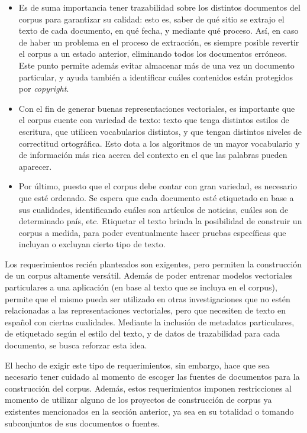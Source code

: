 \begin{itemize}
\item Es de suma importancia tener trazabilidad sobre los distintos documentos del corpus para
garantizar su calidad: esto es, saber de qué sitio se extrajo el texto de cada documento, en qué
fecha, y mediante qué proceso. Así, en caso de haber un problema en el proceso de extracción, es
siempre posible revertir el corpus a un estado anterior, eliminando todos los documentos
erróneos. Este punto permite además evitar almacenar más de una vez un documento particular, y ayuda
también a identificar cuáles contenidos están protegidos por \textit{copyright}.

\item Con el fin de generar buenas representaciones vectoriales, es importante que el corpus cuente
con variedad de texto: texto que tenga distintos estilos de escritura, que utilicen vocabularios
distintos, y que tengan distintos niveles de correctitud ortográfica. Esto dota a los algoritmos de
un mayor vocabulario y de información más rica acerca del contexto en el que las palabras pueden
aparecer.

\item Por último, puesto que el corpus debe contar con gran variedad, es necesario que esté
ordenado. Se espera que cada documento esté etiquetado en base a sus cualidades, identificando
cuáles son artículos de noticias, cuáles son de determinado país, etc. Etiquetar el texto brinda la
posibilidad de construir un corpus a medida, para poder eventualmente hacer pruebas específicas que
incluyan o excluyan cierto tipo de texto.

\end{itemize}

Los requerimientos recién planteados son exigentes, pero permiten la construcción de un corpus
altamente versátil. Además de poder entrenar modelos vectoriales particulares a una aplicación (en
base al texto que se incluya en el corpus), permite que el mismo pueda ser utilizado en otras
investigaciones que no estén relacionadas a las representaciones vectoriales, pero que necesiten de
texto en español con ciertas cualidades. Mediante la inclusión de metadatos particulares, de
etiquetado según el estilo del texto, y de datos de trazabilidad para cada documento, se busca
reforzar esta idea.

El hecho de exigir este tipo de requerimientos, sin embargo, hace que sea necesario tener cuidado al
momento de escoger las fuentes de documentos para la construcción del corpus. Además, estos
requerimientos imponen restricciones al momento de utilizar alguno de los proyectos de construcción
de corpus ya existentes mencionados en la sección anterior, ya sea en su totalidad o tomando
subconjuntos de sus documentos o fuentes.


